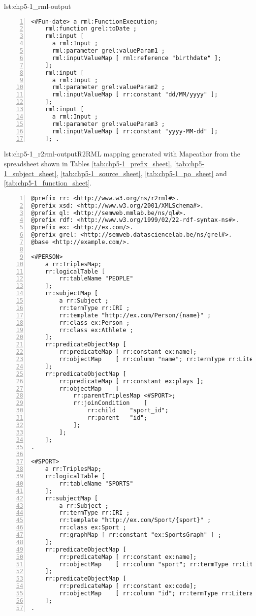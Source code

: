 \begin{captionedlisting}{lst:chp5-1_rml-output}
{\begin{lstlisting}[numbers=left,basicstyle=\ttfamily\small,columns=flexible]
<#Fun-date> a rml:FunctionExecution;
    rml:function grel:toDate ;
    rml:input [
      a rml:Input ;
      rml:parameter grel:valueParam1 ;
      rml:inputValueMap [ rml:reference "birthdate" ];
    ];
    rml:input [
      a rml:Input ;
      rml:parameter grel:valueParam2 ;
      rml:inputValueMap [ rr:constant "dd/MM/yyyy" ];
    ];
    rml:input [
      a rml:Input ;
      rml:parameter grel:valueParam3 ;
      rml:inputValueMap [ rr:constant "yyyy-MM-dd" ];
    ]; .
\end{lstlisting}}
\end{captionedlisting}

\begin{captionedlisting}{lst:chp5-1_r2rml-output}{R2RML mapping generated with Mapeathor from the spreadsheet shown in Tables \ref{tab:chp5-1_prefix_sheet}, \ref{tab:chp5-1_subject_sheet}, \ref{tab:chp5-1_source_sheet}, \ref{tab:chp5-1_po_sheet} and \ref{tab:chp5-1_function_sheet}. }
\centering
{\begin{lstlisting}[numbers=left,basicstyle=\ttfamily\small,columns=flexible]
@prefix rr: <http://www.w3.org/ns/r2rml#>.
@prefix xsd: <http://www.w3.org/2001/XMLSchema#>.
@prefix ql: <http://semweb.mmlab.be/ns/ql#>.
@prefix rdf: <http://www.w3.org/1999/02/22-rdf-syntax-ns#>.
@prefix ex: <http://ex.com/>.
@prefix grel: <http://semweb.datasciencelab.be/ns/grel#>.
@base <http://example.com/>.

<#PERSON>
    a rr:TriplesMap;
    rr:logicalTable [
    	rr:tableName "PEOPLE"
    ];
    rr:subjectMap [
    	a rr:Subject ;
    	rr:termType rr:IRI ;
    	rr:template "http://ex.com/Person/{name}" ;
    	rr:class ex:Person ;
    	rr:class ex:Athlete ;
    ];
    rr:predicateObjectMap [
    	rr:predicateMap	[ rr:constant ex:name];
    	rr:objectMap	[ rr:column "name"; rr:termType rr:Literal; rr:datatype xsd:string; rr:language "en" ]
    ];
    rr:predicateObjectMap [
        rr:predicateMap	[ rr:constant ex:plays ];
        rr:objectMap 	[
            rr:parentTriplesMap <#SPORT>;
            rr:joinCondition	[
                rr:child	"sport_id";
                rr:parent	"id";
            ];
        ];
    ];
.

<#SPORT>
    a rr:TriplesMap;
    rr:logicalTable [
    	rr:tableName "SPORTS"
    ];
    rr:subjectMap [
    	a rr:Subject ;
    	rr:termType rr:IRI ;
    	rr:template "http://ex.com/Sport/{sport}" ;
    	rr:class ex:Sport ;
    	rr:graphMap [ rr:constant "ex:SportsGraph" ] ;
    ];
    rr:predicateObjectMap [
    	rr:predicateMap	[ rr:constant ex:name];
    	rr:objectMap	[ rr:column "sport"; rr:termType rr:Literal; rr:datatype xsd:string; rr:language "en" ]
    ];
    rr:predicateObjectMap [
    	rr:predicateMap	[ rr:constant ex:code];
    	rr:objectMap	[ rr:column "id"; rr:termType rr:Literal; rr:datatype xsd:integer ]
    ];
.
\end{lstlisting}}
\end{captionedlisting}



